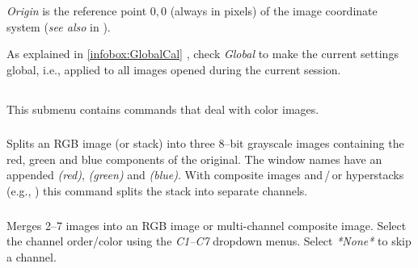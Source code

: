 \emph{Origin} is the reference point $0,0$ (always in pixels) of
the image coordinate system (\emph{see also }
in ). 

As explained in \ref{infobox:GlobalCal} ,
check \emph{Global} to make the current settings global, i.e., applied
to all images opened during the current session.




\subsection{\protect{}\label{sub:ColorSubmenu}}

This submenu contains commands that deal with color images. 


\subsubsection{\protect{}\label{sub:Split-Channels}}

Splits an RGB image (or stack) into three 8--bit grayscale images
containing the red, green and blue components of the original.
The window names have an appended \emph{(red)}, \emph{(green)} and
\emph{(blue)}. With composite images and\,/\,or hyperstacks (e.g.,
)
this command splits the stack into separate channels.




\subsubsection[\protect\userinterface{Merge Channels\ldots{}}]{\protect{}\label{sub:Merge-Channels...}}

Merges 2--7 images into an RGB image or multi-channel composite image.
Select the channel order/color using the \emph{C1--C7} dropdown menus.
Select \emph{{*}None{*}} to skip a channel.

